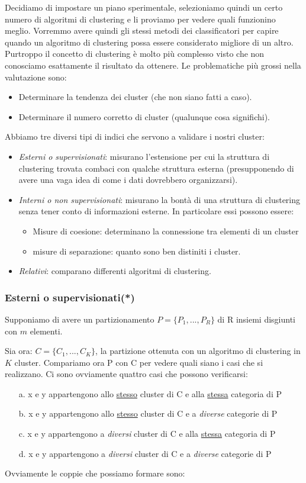 Decidiamo di impostare un piano sperimentale, selezioniamo quindi  un certo numero di algoritmi di clustering e li proviamo per vedere quali funzionino meglio. Vorremmo avere quindi gli stessi metodi dei classificatori per capire quando un algoritmo di clustering possa essere considerato migliore di un altro. Purtroppo il concetto di clustering è molto più complesso visto che non conosciamo esattamente il risultato da ottenere.
Le problematiche più grossi nella valutazione sono:
\begin{itemize}
	\item Determinare la tendenza dei cluster (che non siano fatti a caso).
	\item Determinare il numero corretto di cluster (qualunque cosa significhi).
\end{itemize} 
Abbiamo tre diversi tipi di indici che servono a validare i nostri cluster:
\begin{itemize}
	\item \textit{Esterni o supervisionati}: misurano l'estensione per cui la struttura di clustering trovata combaci con qualche struttura esterna (presupponendo di avere una vaga idea di come i dati dovrebbero organizzarsi).
	\item \textit{Interni o non supervisionati}: misurano la bontà di una struttura di clustering senza tener conto di informazioni esterne. In particolare essi possono essere:
	\begin{itemize}
		\item Misure di coesione: determinano la connessione tra elementi di un cluster
		\item misure di separazione: quanto sono ben distiniti i cluster. 
	\end{itemize}
	\item \textit{Relativi}: comparano differenti algoritmi di clustering. 
\end{itemize}
\subsubsection{Esterni o supervisionati(*)}

Supponiamo di avere un partizionamento $P = \{P_{1}, ..., P_{R}\}$ di R insiemi disgiunti con $m$ elementi. 

Sia ora: $C = \{C_{1}, ..., C_{K}\}$, la partizione ottenuta con un algoritmo di clustering in $K$ cluster. Compariamo ora P con C per vedere quali siano i casi che si realizzano.
Ci sono ovviamente quattro casi che possono verificarsi:
\begin{enumerate}
	\item[a.]  x e y appartengono allo \underline{stesso} cluster di C e alla \underline{stessa} categoria di P
	\item [b.] x e y appartengono allo \underline{stesso} cluster di C e a \textit{diverse} categorie di P
	\item [c.] x e y appartengono a \textit{diversi} cluster di C e alla \underline{stessa} categoria di P
	\item[d.]  x e y appartengono a \textit{diversi} cluster di C e a \textit{diverse} categorie di P
\end{enumerate}
Ovviamente le coppie che possiamo formare sono:


